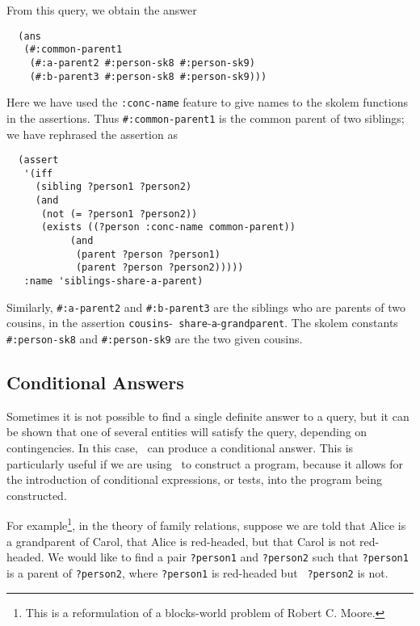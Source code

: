 From this query, we obtain the answer
\begin{verbatim}
  (ans
   (#:common-parent1
    (#:a-parent2 #:person-sk8 #:person-sk9)
    (#:b-parent3 #:person-sk8 #:person-sk9)))
\end{verbatim}
Here we have used the {\tt :conc-name} feature to give names to the
skolem functions in the assertions.  Thus \verb'#:common-parent1' is the
common parent of two siblings; we have rephrased the assertion as
\begin{verbatim}
  (assert
   '(iff
     (sibling ?person1 ?person2)
     (and
      (not (= ?person1 ?person2))
      (exists ((?person :conc-name common-parent))
           (and
            (parent ?person ?person1)
            (parent ?person ?person2)))))
   :name 'siblings-share-a-parent)
\end{verbatim}
Similarly, \verb'#:a-parent2' and \verb'#:b-parent3' are the siblings
who are parents of two cousins, in the assertion {\tt cousins}-{\tt
share}-{\tt a}-{\tt grandparent}.  The skolem constants
\verb'#:person-sk8' and \verb'#:person-sk9' are the two given cousins.
\subsection{Conditional Answers}
\label{subsec-conditional-answers}

Sometimes it is not possible to find a single definite answer to a
query, but it can be shown that one of several entities will satisfy
the query, depending on contingencies.  In this case, \snark\  can
produce a conditional answer.  This is particularly useful if we are
using \snark\  to construct a program, because it allows for the
introduction of conditional expressions, or tests, into the program
being constructed.

For example\footnote{This is a reformulation of a blocks-world problem
of Robert C. Moore.}, in the theory of family relations, suppose we
are told that Alice is a grandparent of Carol, that Alice is
red-headed, but that Carol is not red-headed.  We would like to find a
pair {\tt ?person1} and {\tt ?person2} such that {\tt ?person1} is a
parent of {\tt ?person2}, where {\tt ?person1} is red-headed but {\tt
?person2} is not.



